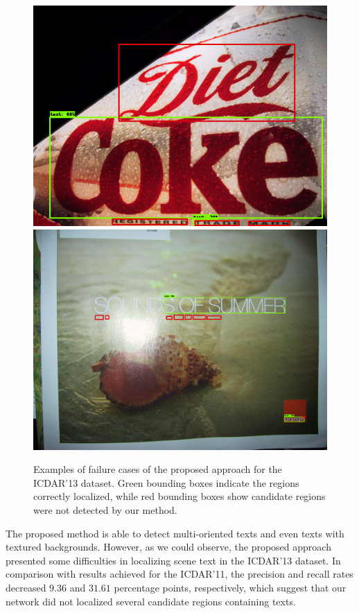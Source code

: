 \begin{figure}[!h]
    \includegraphics[height=0.20\textheight]{VISAPP/figs/qualitative-results/icdar13/41m.png}
    \includegraphics[height=0.20\textheight]{VISAPP/figs/qualitative-results/icdar13/48m.png}

	\caption{Examples of failure cases of the proposed approach for the ICDAR'13 dataset. Green bounding boxes indicate the regions correctly localized, while red bounding boxes show candidate regions were not detected by our method.}
	\label{fig:qualitative-results-bad-13}
\end{figure}

The proposed method is able to detect multi-oriented texts and even texts with textured backgrounds. However, as we could observe, the proposed approach presented some difficulties in localizing scene text in the ICDAR'13 dataset. In comparison with results achieved for the ICDAR'11, the precision and recall rates decreased $9.36$ and $31.61$ percentage points, respectively, which suggest that our network did not localized several candidate regions containing texts.

